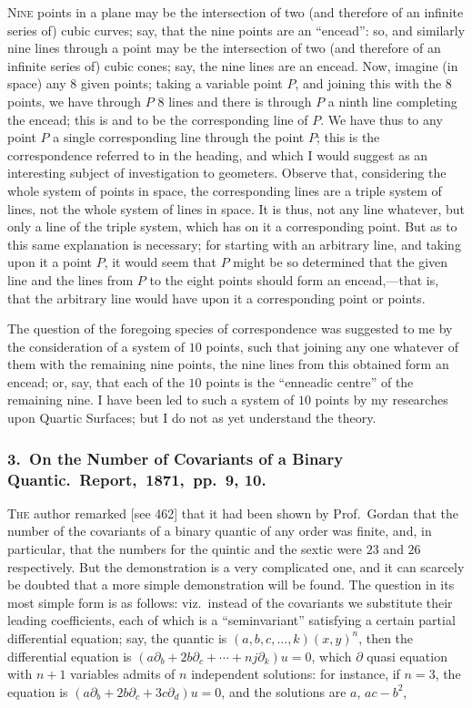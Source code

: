 \documentclass[11pt,a4paper]{book}
\begin{document}
\textsc{Nine} points in a plane may be the intersection of two (and therefore of an
infinite series of) cubic curves; say, that the nine points are an ``encead'': so, and
similarly nine lines through a point may be the intersection of two (and therefore of
an infinite series of) cubic cones; say, the nine lines are an encead.  Now, imagine
(in space) any $8$ given points; taking a variable point $P$, and joining this with the
$8$ points, we have through $P$ $8$ lines and there is through $P$ a ninth line completing
the encead; this is and to be the corresponding line of $P$.  We have thus to any
point $P$ a single corresponding line through the point $P$; this is the correspondence
referred to in the heading, and which I would suggest as an interesting subject of
investigation to geometers.  Observe that, considering the whole system of points in
space, the corresponding lines are a triple system of lines, not the whole system of
lines in space.  It is thus, not any line whatever, but only a line of the triple system,
which has on it a corresponding point.  But as to this same explanation is necessary;
for starting with an arbitrary line, and taking upon it a point $P$, it would seem
that $P$ might be so determined that the given line and the lines from $P$ to the
eight points should form an encead,---that is, that the arbitrary line would have upon
it a corresponding point or points.

The question of the foregoing species of correspondence was suggested to me by
the consideration of a system of $10$ points, such that joining any one whatever of
them with the remaining nine points, the nine lines from this obtained form an encead; or,
say, that each of the $10$ points is the ``enneadic centre'' of the remaining nine.  I
have been led to such a system of $10$ points by my researches upon Quartic Surfaces;
but I do not as yet understand the theory.

\subsubsection*{3.\ On the Number of Covariants of a Binary Quantic.\ Report,\ 1871,\ pp.\ 9, 10.}

\textsc{The} author remarked [see 462] that it had been shown by Prof.\ Gordan that the
number of the covariants of a binary quantic of any order was finite, and, in particular,
that the numbers for the quintic and the sextic were $23$ and $26$ respectively.  But the
demonstration is a very complicated one, and it can scarcely be doubted that a more
simple demonstration will be found.  The question in its most simple form is as
follows: viz.\ instead of the covariants we substitute their leading coefficients, each of
which is a ``seminvariant'' satisfying a certain partial differential equation; say, the
quantic is $(a, b, c, \ldots, k)(x, y)^n$, then the differential equation is $(a\partial_b + 2b\partial_c + \cdots + n j\partial_k)u = 0$,
which $\partial$ quasi equation with $n + 1$ variables admits of $n$ independent solutions: for
instance, if $n = 3$, the equation is $(a\partial_b + 2b\partial_c + 3c\partial_d)u = 0$, and the solutions are $a$, $ac - b^2$,
\clearpage
\clearpage
\end{document}
